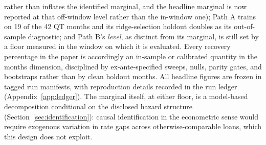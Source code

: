 \documentclass[12pt]{article}
\begin{document}
rather than inflates the identified marginal, and the headline marginal is now reported at that off-window level rather than the in-window one); Path A trains on 19 of the 42 QT months and its ridge-selection holdout doubles as its out-of-sample diagnostic; and Path B's \emph{level}, as distinct from its marginal, is still set by a floor measured in the window on which it is evaluated. Every recovery percentage in the paper is accordingly an in-sample or calibrated quantity in the months dimension, disciplined by ex-ante-specified sweeps, nulls, parity gates, and bootstraps rather than by clean holdout months. All headline figures are frozen in tagged run manifests, with reproduction details recorded in the run ledger (Appendix~\ref{app:ledger}). The marginal itself, at either floor, is a model-based decomposition conditional on the disclosed hazard structure (Section~\ref{sec:identification}): causal identification in the econometric sense would require exogenous variation in rate gaps across otherwise-comparable loans, which this design does not exploit.
\end{document}

